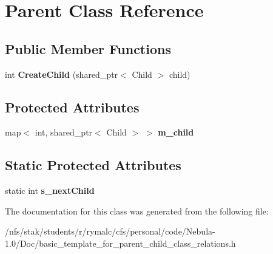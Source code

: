 \hypertarget{classParent}{
\section{Parent Class Reference}
\label{classParent}
}
\subsection*{Public Member Functions}
\begin{DoxyCompactItemize}
\item 
\hypertarget{classParent_a7c07489f41e750e9836ab493512b0bbc}{
int {\bfseries CreateChild} (shared\_\-ptr$<$ Child $>$ child)}
\label{classParent_a7c07489f41e750e9836ab493512b0bbc}

\end{DoxyCompactItemize}
\subsection*{Protected Attributes}
\begin{DoxyCompactItemize}
\item 
\hypertarget{classParent_a8f04780dea4bba57e0e68789a9df174f}{
map$<$ int, shared\_\-ptr$<$ Child $>$ $>$ {\bfseries m\_\-child}}
\label{classParent_a8f04780dea4bba57e0e68789a9df174f}

\end{DoxyCompactItemize}
\subsection*{Static Protected Attributes}
\begin{DoxyCompactItemize}
\item 
\hypertarget{classParent_a03df22d4db121f3df87d0232ca93d5ad}{
static int {\bfseries s\_\-nextChild}}
\label{classParent_a03df22d4db121f3df87d0232ca93d5ad}

\end{DoxyCompactItemize}


The documentation for this class was generated from the following file:\begin{DoxyCompactItemize}
\item 
/nfs/stak/students/r/rymalc/cfs/personal/code/Nebula-\/1.0/Doc/basic\_\-template\_\-for\_\-parent\_\-child\_\-class\_\-relations.h\end{DoxyCompactItemize}
